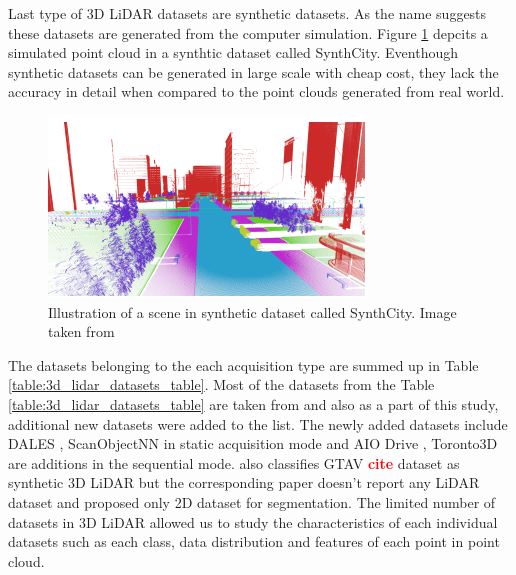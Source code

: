     Last type of 3D LiDAR datasets are synthetic datasets. 
    As the name suggests these datasets are generated from the computer simulation. 
    Figure \ref{fig:synthetic} depcits a simulated point cloud in a synthtic dataset called SynthCity.
    Eventhough synthetic datasets can be generated in large scale with cheap cost, they lack the accuracy in detail when compared to the point clouds generated from real world.
    \begin{figure}[h!]
        \centering
        \includegraphics[scale=0.5]{images/synthcity.png}
        \caption{Illustration of a scene in synthetic dataset called SynthCity. Image taken from \cite{griffiths2019synthcity}}
        \label{fig:synthetic}
    \end{figure}
    
    The datasets belonging to the each acquisition type are summed up in  Table \ref{table:3d_lidar_datasets_table}.
    Most of the datasets from the Table \ref{table:3d_lidar_datasets_table} are taken from \cite{survey3d} and also as a part of this study, additional new datasets were added to the list.
    The newly added datasets include DALES \cite{varney2020dales}, ScanObjectNN \cite{scanobejctnn} in static acquisition mode and AIO Drive \cite{Weng2020_AIODrive}, Toronto3D \cite{tan2020toronto3d} are additions in the sequential mode.
    \cite{survey3d} also classifies GTAV \textcolor{red}{\textbf{cite}} dataset as synthetic 3D LiDAR but the corresponding paper doesn't report any LiDAR dataset and proposed only 2D dataset for segmentation.
    The limited number of datasets in 3D LiDAR allowed us to study the characteristics of each individual datasets such as each class, data distribution and features of each point in point cloud. 
    
